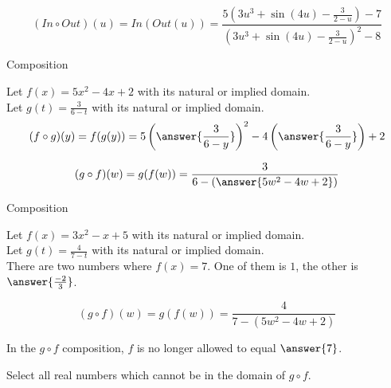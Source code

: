 \documentclass{ximera}
\begin{document}
\[
(In \circ Out)(u) = In(Out(u)) = \frac{5 \left( 3u^3 + \sin(4u) - \frac{3}{2-u} \right)-7}{\left( 3u^3 + \sin(4u) - \frac{3}{2-u} \right)^2-8}
\]





\begin{example} Composition 



Let $f(x) = 5x^2 - 4x + 2$ with its natural or implied domain. \\
Let $g(t) = \frac{3}{6-t}$ with its natural or implied domain. \\



\[
(f \circ g)(y) = f(g(y)) = 5 \left( \answer{\frac{3}{6-y}} \right)^2 - 4 \left( \answer{\frac{3}{6-y}} \right) + 2
\]





\[
(g \circ f)(w) = g(f(w)) = \frac{3}{6 - \left( \answer{5w^2 - 4w + 2} \right)}
\]



\end{example}










\begin{example} Composition 



Let $f(x) = 3x^2 - x + 5$ with its natural or implied domain. \\
Let $g(t) = \frac{4}{7-t}$ with its natural or implied domain. \\





There are two numbers where $f(x) = 7$.  One of them is $1$, the other is $\answer{\frac{-2}{3}}$.






\[
(g \circ f)(w) = g(f(w)) = \frac{4}{7 - (5w^2 - 4w + 2)}
\]



In the $g \circ f$ composition, $f$ is no longer allowed to equal $\answer{7}$.

Select all real numbers which cannot be in the domain of $g \circ f$.

\begin{selectAll}
\end{selectAll}


\end{example}
\end{document}
